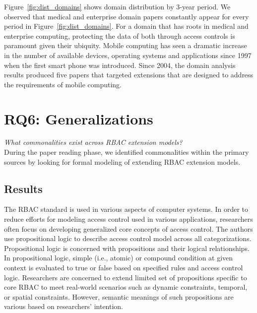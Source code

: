 Figure~\ref{fig:dist_domains} shows domain distribution by 3-year period.
We observed that medical and enterprise domain papers constantly appear for every period in Figure~\ref{fig:dist_domains}.
For a domain that has roots in medical and enterprise computing, protecting the data of both through access controls is paramount given their ubiquity. 
Mobile computing has seen a dramatic increase in the number of available devices, operating systems and applications since 1997 when the first smart phone was introduced. Since 2004, the domain analysis results produced five papers that targeted extensions that are designed to address the requirements of mobile computing. 



\section{RQ6: Generalizations} \label{sec:generalizations}

\textit{What commonalities exist across RBAC extension models?}
\\

During the paper reading phase, we identified commonalities within the primary sources
by looking for formal modeling of extending RBAC extension models.

\subsection{Results}

The RBAC standard is used in various aspects of computer systems. In order to reduce efforts for modeling access control used in various applications, researchers often focus on developing generalized core concepts of access control.
The authors use propositional logic to describe access control model across all categorizations. Propositional logic is concerned with propositions and their logical relationships. In propositional logic, simple (i.e., atomic) or compound condition at given context is evaluated to true or false based on specified rules and access control logic. Researchers are concerned to extend limited set of propositions specific to core RBAC to meet real-world scenarios such as dynamic constraints, temporal, or spatial constraints. However, semantic meanings of such propositions are various based on researchers' intention.


